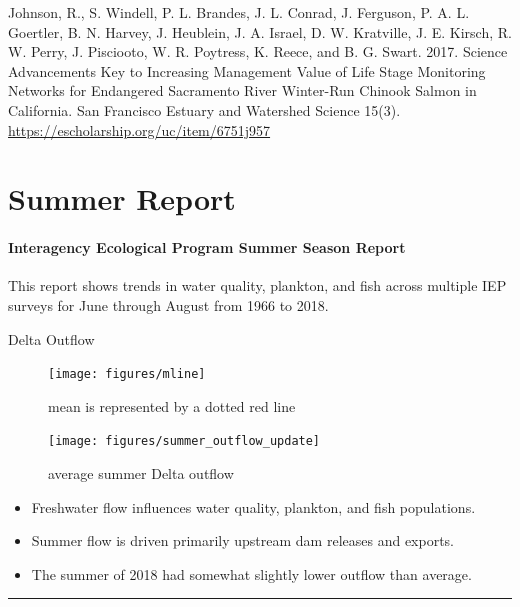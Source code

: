 \documentclass[
]{book}
\providecommand{\tightlist}{%
  \setlength{\itemsep}{0pt}\setlength{\parskip}{0pt}}
\begin{document}
\begin{disclaimer}
Johnson, R., S. Windell, P. L. Brandes, J. L. Conrad, J. Ferguson, P. A.
L. Goertler, B. N. Harvey, J. Heublein, J. A. Israel, D. W. Kratville,
J. E. Kirsch, R. W. Perry, J. Pisciooto, W. R. Poytress, K. Reece, and
B. G. Swart. 2017. Science Advancements Key to Increasing Management
Value of Life Stage Monitoring Networks for Endangered Sacramento River
Winter-Run Chinook Salmon in California. San Francisco Estuary and
Watershed Science 15(3). \url{https://escholarship.org/uc/item/6751j957}
\end{disclaimer}

\hypertarget{Summer}{%
\chapter{Summer Report}\label{Summer}}

\hypertarget{interagency-ecological-program-summer-season-report}{%
\subsubsection{Interagency Ecological Program Summer Season Report}\label{interagency-ecological-program-summer-season-report}}

This report shows trends in water quality, plankton, and fish across multiple IEP
surveys for June through August from 1966 to 2018.

Delta Outflow

\begin{figure}
\texttt{[image: figures/mline]} \caption{mean is represented by a dotted red line}\label{fig:unnamed-chunk-47}
\end{figure}

\begin{figure}
\texttt{[image: figures/summer\_outflow\_update]} \caption{average summer Delta outflow}\label{fig:unnamed-chunk-48}
\end{figure}

\begin{itemize}
\tightlist
\item
  Freshwater flow influences water quality, plankton, and fish populations.
\item
  Summer flow is driven primarily upstream dam releases and exports.
\item
  The summer of 2018 had somewhat slightly lower outflow than average.
\end{itemize}

\begin{center}\rule{0.5\linewidth}{0.5pt}\end{center}
\end{document}
